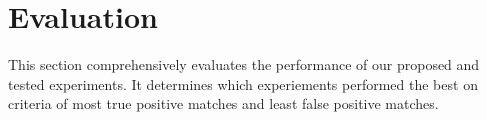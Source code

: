 \section{Evaluation}
\label{sec:eval}

This section comprehensively evaluates the performance of our proposed and tested experiments. It determines which experiements performed the best on criteria of 
most true positive matches and least false positive matches. 
